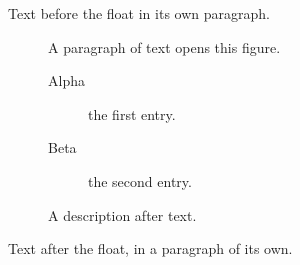 \documentclass[10pt]{article}
\begin{document}
Text before the float in its own paragraph.

\begin{figure}[h]
A paragraph of text opens this figure.
\begin{description}
\item[Alpha] the first entry.
\item[Beta] the second entry.
\end{description}
\caption{A description after text.}
\end{figure}

Text after the float, in a paragraph of its own.
\end{document}
